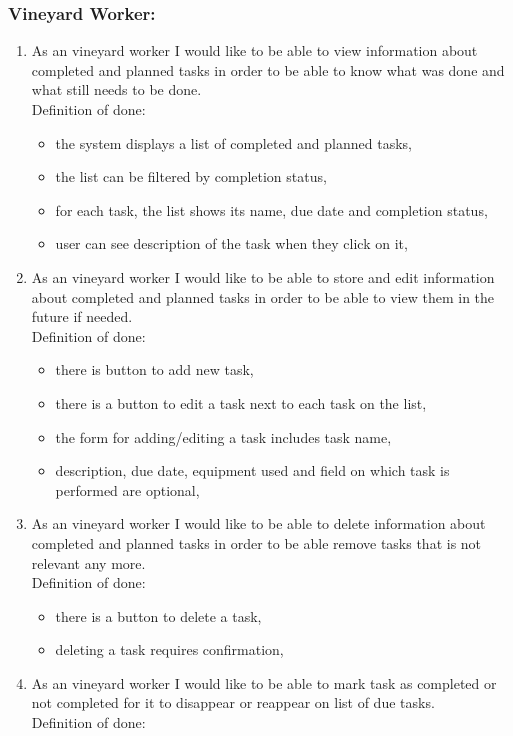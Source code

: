 \subsubsection{Vineyard Worker:}
\begin{enumerate}
	\item As an vineyard worker I would like to be able to view information about completed and planned tasks in order to be able to know what was done and what still needs to be done. \\Definition of done:
	\begin{itemize}
		\item the system displays a list of completed and planned tasks,
		\item the list can be filtered by completion status,
		\item for each task, the list shows its name, due date and completion status,
		\item user can see description of the task when they click on it,
	\end{itemize}
	\item As an vineyard worker I would like to be able to store and edit information about completed and planned tasks in order to be able to view them in the future if needed. \\Definition of done:
	\begin{itemize}
		\item there is button to add new task,
		\item there is a button to edit a task next to each task on the list,
		\item the form for adding/editing a task includes task name,
		\item description, due date, equipment used and field on which task is performed are optional,
	\end{itemize}
	\item As an vineyard worker I would like to be able to delete information about completed and planned tasks in order to be able remove tasks that is not relevant any more. \\Definition of done:
	\begin{itemize}
		\item there is a button to delete a task,
		\item deleting a task requires confirmation,
	\end{itemize}
	\item As an vineyard worker I would like to be able to mark task as completed or not completed for it to disappear or reappear on list of due tasks. \\Definition of done:

\end{enumerate}
